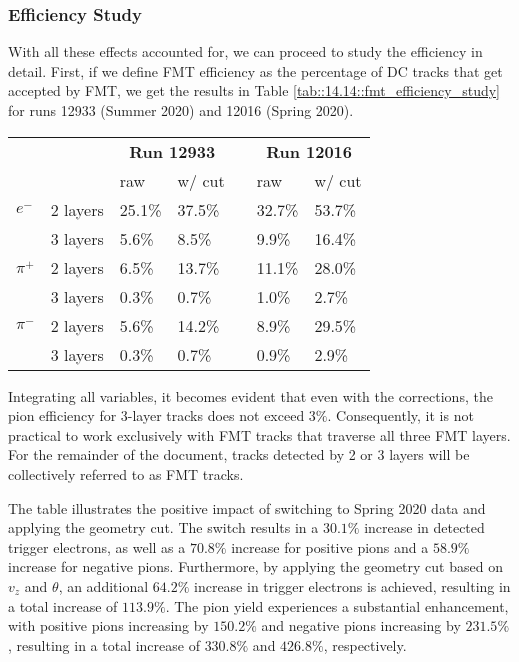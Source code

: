\subsubsection{Efficiency Study}
\label{14.14::efficiency_study}
    With all these effects accounted for, we can proceed to study the efficiency in detail.
    First, if we define FMT efficiency as the percentage of DC tracks that get accepted by FMT, we get the results in Table \ref{tab::14.14::fmt_efficiency_study} for runs 12933 (Summer 2020) and 12016 (Spring 2020).

    \begin{center}
        \begin{tabularx}{0.60\textwidth}{llllcll}
            \toprule
            & & \multicolumn{2}{c}{\textbf{Run 12933}}  & & \multicolumn{2}{c}{\textbf{Run 12016}} \\
                             &          & raw  & w/ cut   & & raw  & w/ cut   \\
            \midrule \midrule
            \textbf{$e^-$}   & 2 layers & 25.1\% & 37.5\% & & 32.7\% & 53.7\% \\
                             & 3 layers &  5.6\% &  8.5\% & &  9.9\% & 16.4\% \\
            \midrule
            \textbf{$\pi^+$} & 2 layers &  6.5\% & 13.7\% & & 11.1\% & 28.0\% \\
                             & 3 layers &  0.3\% &  0.7\% & &  1.0\% &  2.7\% \\
            \midrule
            \textbf{$\pi^-$} & 2 layers &  5.6\% & 14.2\% & &  8.9\% & 29.5\% \\
                             & 3 layers &  0.3\% &  0.7\% & &  0.9\% &  2.9\% \\
            \bottomrule
        \end{tabularx}
        \label{tab::14.14::fmt_efficiency_study}
    \end{center}

    Integrating all variables, it becomes evident that even with the corrections, the pion efficiency for 3-layer tracks does not exceed $3\%$.
    Consequently, it is not practical to work exclusively with FMT tracks that traverse all three FMT layers.
    For the remainder of the document, tracks detected by 2 or 3 layers will be collectively referred to as FMT tracks.

    The table illustrates the positive impact of switching to Spring 2020 data and applying the geometry cut.
    The switch results in a $30.1\%$ increase in detected trigger electrons, as well as a $70.8\%$ increase for positive pions and a $58.9\%$ increase for negative pions.
    Furthermore, by applying the geometry cut based on $v_z$ and $\theta$, an additional $64.2\%$ increase in trigger electrons is achieved, resulting in a total increase of $113.9\%$.
    The pion yield experiences a substantial enhancement, with positive pions increasing by $150.2\%$ and negative pions increasing by $231.5\%$, resulting in a total increase of $330.8\%$ and $426.8\%$, respectively.

